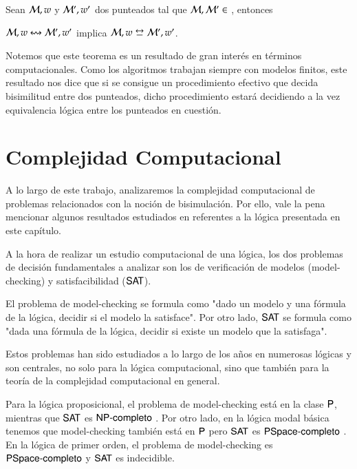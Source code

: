 \begin{teorema}\label{thm:finite-equivalence-implies-bisim}
    Sean $\mathcal{M},w$ y $\mathcal{M}',w'$ dos \ultss punteados tal que $\mathcal{M}, \mathcal{M}' \in$ \MFD, entonces
    \begin{center}
        $\mathcal{M},w \mathrel{\leftrightsquigarrow} \mathcal{M}', w'$ implica $\model,w \bisim \model', w'$.
    \end{center}
\end{teorema}

Notemos que este teorema es un resultado de gran interés en términos computacionales. Como los algoritmos trabajan siempre con modelos 
finitos, este resultado nos dice que si se consigue un procedimiento efectivo que decida bisimilitud entre dos \ultss punteados, dicho 
procedimiento estará decidiendo a la vez equivalencia lógica entre los \ultss punteados en cuestión.


\section{Complejidad Computacional}

A lo largo de este trabajo, analizaremos la complejidad computacional de problemas relacionados con la noción de bisimulación. 
Por ello, vale la pena mencionar algunos resultados estudiados en \cite{ArecesFSV25,SaraviaPHD} referentes a la lógica presentada en este 
capítulo. 

A la hora de realizar un estudio computacional de una lógica, los dos problemas de decisión fundamentales a analizar son los de 
verificación de modelos (model-checking) y satisfacibilidad ($\rm\textsf{SAT}$).

El problema de model-checking se formula como "dado un modelo y una fórmula de la lógica, decidir si el modelo la satisface". Por otro lado, 
$\rm\textsf{SAT}$ se formula como "dada una fórmula de la lógica, decidir si existe un modelo que la satisfaga". 

Estos problemas han sido estudiados a lo largo de los años en numerosas lógicas y son centrales, no solo para la lógica computacional, sino que 
también para la teoría de la complejidad computacional en general. 

Para la lógica proposicional, el problema de model-checking está en la clase $\rm\textsf{P}$, mientras que $\rm\textsf{SAT}$ es $\rm\textsf{NP-completo}$ 
\cite[Capítulo 2, Sección 3]{Goldreich_2008}. Por otro lado, en la lógica modal básica tenemos que model-checking también 
está en $\rm\textsf{P}$ pero $\rm\textsf{SAT}$ es $\rm\textsf{PSpace-completo}$ \cite[Capítulo 4]{HandbookModalLogic}. En la lógica de primer orden, el problema de 
model-checking es $\rm\textsf{PSpace-completo}$ \cite[Capítulo 5, Sección 4]{Goldreich_2008} y $\rm\textsf{SAT}$ es indecidible. 

